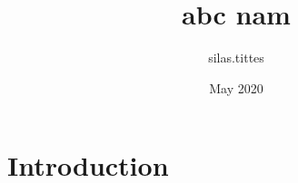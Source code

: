 \documentclass{article}
\title{abc nam}
\author{silas.tittes }
\date{May 2020}
\begin{document}
\maketitle

\section{Introduction}
\end{document}
